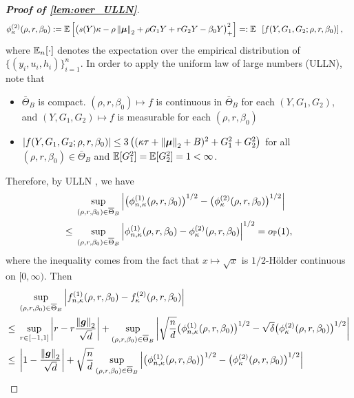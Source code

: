 \begin{proof}[\textbf{Proof of \cref{lem:over_ULLN}}]
\begin{equation*}
\begin{aligned}
        \phi^{(2)}_{\kappa}(\rho, r, \beta_0) & := \E\left[  \bigl(  s(Y) \kappa - \rho \norm{\bmu}_2 + \rho G_1 Y
        + r G_2 Y - \beta_0 Y \bigr)_+^2 \right]
        = : \mathmakebox[\widthof{$\E_n$}][l]{\E}\left[ f(Y, G_1, G_2 ; \rho, r, \beta_0) \right] ,
    \end{aligned}
\end{equation*}
where $\mathbb{E}_n[\cdot]$ denotes the expectation over the empirical distribution of $\{ (y_i, u_i, h_i) \}_{i = 1}^n$. In order to apply the uniform law of large numbers (ULLN), note that 
\begin{itemize}
    \item $\bar\Theta_{B}$ is compact. $(\rho, r, \beta_0) \mapsto f$ is continuous in $\bar\Theta_{B}$ for each $(Y, G_1, G_2)$, and $(Y, G_1, G_2) \mapsto f$ is measurable for each $(\rho, r, \beta_0)$
    \item $\left|{f(Y, G_1, G_2 ; \rho, r, \beta_0)}\right| \le 3 \left( (\kappa\tau + \left\|{{\boldsymbol{\mu}}}\right\|_2 + B)^2 + G_1^2 + G_2^2 \right)$ for all $(\rho, r, \beta_0) \in \bar\Theta_{B}$ and $\mathbb{E}[G_1^2] = \mathbb{E}[G_2^2] = 1 < \infty$.
\end{itemize}
Therefore, by ULLN \cite[Lemma 2.4]{newey1994large}, we have
\begin{align*}
    & \sup_{ (\rho, r, \beta_0) \in \overline\Theta_{B} }
    \left|{ \bigl( \phi^{(1)}_{n, \kappa}(\rho, r, \beta_0) \bigr)^{1/2} - \bigl( \phi^{(2)}_{\kappa}(\rho, r, \beta_0) \bigr)^{1/2} }\right| \\
    \le {} & \sup_{ (\rho, r, \beta_0) \in \overline\Theta_{B} }
    \left|{ \phi^{(1)}_{n, \kappa}(\rho, r, \beta_0) -  \phi^{(2)}_{\kappa}(\rho, r, \beta_0) }\right|^{1/2} = o_{\mathbb{P}}(1),
\end{align*}
where the inequality comes from the fact that $x \mapsto \sqrt{x}$ is $1/2$-Hölder continuous on $[0, \infty)$. Then
\begin{align*}
        & \sup_{ (\rho, r, \beta_0) \in \bar\Theta_{B} } \abs{ f^{(1)}_{n,\kappa}(\rho,r,\beta_0) - f^{(2)}_{\kappa}(\rho,r,\beta_0)} \\
        \le {} &  \sup_{r \in [-1, 1]} \abs{r - r\frac{\norm{\vg}_2}{\sqrt{d}}} + 
        \sup_{ (\rho, r, \beta_0) \in \bar\Theta_{B} } \abs{ \sqrt{\frac{n}{d}} \bigl( \phi^{(1)}_{n, \kappa}(\rho, r, \beta_0) \bigr)^{1/2}
        -  \sqrt{\delta} \bigl( \phi^{(2)}_{\kappa}(\rho, r, \beta_0) \bigr)^{1/2}  }  \\
        \le {} & \abs{1 - \frac{\norm{\vg}_2}{\sqrt{d}}} +  
        \sqrt{\frac{n}{d}}
        \sup_{ (\rho, r, \beta_0) \in \bar\Theta_{B} }
        \abs{ \bigl( \phi^{(1)}_{n, \kappa}(\rho, r, \beta_0) \bigr)^{1/2} - \bigl( \phi^{(2)}_{\kappa}(\rho, r, \beta_0) \bigr)^{1/2} } \\

\end{align*}
\end{proof}
